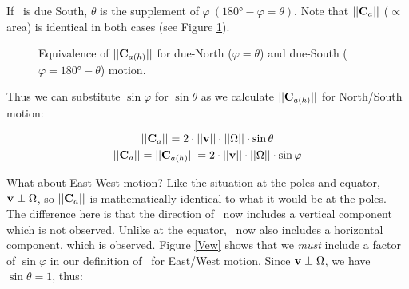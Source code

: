 If \vVs\ is due South, $\theta$ is the supplement of $\varphi\ (\ang{180}-\varphi=\theta)$. Note that $||\textbf{C$_a$}||$ ($\propto$ area) is identical in both cases (see Figure \ref{Vns}).
\begin{figure}
\begin{center}
	\caption{Equivalence of $||\textbf{C$_{a(h)}$}||$ for due-North ($\varphi=\theta$) and due-South ($\varphi=\ang{180}-\theta$) motion.}
	\label{Vns}
  	\end{center}
	\end{figure}

Thus we can substitute $\sin\varphi$ for $\sin\theta$ as we calculate $||\textbf{C$_{a(h)}$}||$ for North/South motion:

\begin{gather}
||\textbf{C$_a$}||=2\cdot||\textbf{v}||\cdot||\Omega||\cdot\sin\theta\nonumber\\
||\textbf{C$_a$}||=||\textbf{C$_{a(h)}$}||=2\cdot||\textbf{v}||\cdot||\Omega||\cdot\sin\varphi\label{vCah_ns}
\end{gather}

What about East-West motion? Like the situation at the poles and equator, $\textbf{v}\perp\Omega$, so $||\textbf{C$_a$}||$ is mathematically identical to what it would be at the poles. The difference here is that the direction of \vCa\ now includes a vertical component which is not observed. Unlike at the equator, \vCa\ now also includes a horizontal component, which is observed. Figure \ref{Vew} shows that we \emph{must} include a factor of $\sin\varphi$ in our definition of \vCah\ for East/West motion. Since $\textbf{v}\perp\Omega$, we have $\sin\theta=1$, thus: 

